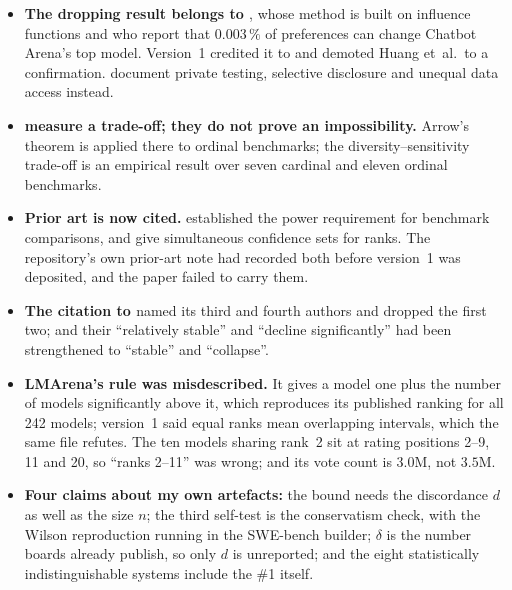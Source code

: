\documentclass[11pt]{article}
\begin{document}
\begin{itemize}
\item \textbf{The dropping result belongs to \citet{huang2025}}, whose method is built on
influence functions and who report that $0.003\,\%$ of preferences can change Chatbot
Arena's top model. Version~1 credited it to \citet{singh2025} and demoted Huang et~al.\ to
a confirmation. \citet{singh2025} document private testing, selective disclosure and
unequal data access instead.
\item \textbf{\citet{zhang2024} measure a trade-off; they do not prove an impossibility.}
Arrow's theorem is applied there to ordinal benchmarks; the diversity--sensitivity
trade-off is an empirical result over seven cardinal and eleven ordinal benchmarks.
\item \textbf{Prior art is now cited.} \citet{card2020} established the power requirement
for benchmark comparisons, and \citet{mogstad2024} give simultaneous confidence sets for
ranks. The repository's own prior-art note had recorded both before version~1 was
deposited, and the paper failed to carry them.
\item \textbf{The citation to \citet{lunardi2025}} named its third and fourth authors and
dropped the first two; and their ``relatively stable'' and ``decline significantly'' had
been strengthened to ``stable'' and ``collapse''.
\item \textbf{LMArena's rule was misdescribed.} It gives a model one plus the number of
models significantly above it, which reproduces its published ranking for all 242 models;
version~1 said equal ranks mean overlapping intervals, which the same file refutes. The
ten models sharing rank~2 sit at rating positions 2--9, 11 and 20, so ``ranks 2--11'' was
wrong; and its vote count is $3.0$M, not $3.5$M.
\item \textbf{Four claims about my own artefacts:} the bound needs the discordance $d$ as
well as the size $n$; the third self-test is the conservatism check, with the Wilson
reproduction running in the SWE-bench builder; $\delta$ is the number boards already
publish, so only $d$ is unreported; and the eight statistically indistinguishable systems
include the \#1 itself.
\end{itemize}
\end{document}
